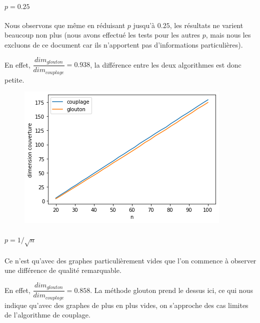 \documentclass[12pt]{article}
\begin{document}
\begin{enumerate}
                \paragraph{$p = 0.25$}
                    Nous observons que même en réduisant $p$ jusqu'à $0.25$, les résultats ne varient beaucoup non plus (nous avons effectué les tests pour les autres $p$, mais nous les excluons de ce document car ils n'apportent pas d'informations particulières).
                    
                    En effet, $\dfrac{dim_{glouton}}{dim_{couplage}} = 0.938 $, la différence entre les deux algorithmes est donc petite.
                    
                    \begin{figure}[H]
                        \includegraphics[scale=0.5]{figures/qualite_025.png}
                        \centering
                    \end{figure}
                
                \paragraph{$p = 1/ \sqrt{n}$}
                    Ce n'est qu'avec des graphes particulièrement vides que l'on commence à observer une différence de qualité remarquable.

                    En effet, $\dfrac{dim_{glouton}}{dim_{couplage}} = 0.858 $.
                    La méthode glouton prend le dessus ici, ce qui nous indique qu'avec des graphes de plus en plus vides, on s'approche des cas limites de l'algorithme de couplage.


\end{enumerate}
\end{document}
